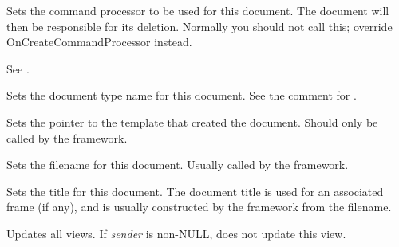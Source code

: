 Sets the command processor to be used for this document. The document will then be responsible
for its deletion. Normally you should not call this; override OnCreateCommandProcessor
instead.

See .



Sets the document type name for this document. See the comment for .



Sets the pointer to the template that created the document. Should only be called by the
framework.



Sets the filename for this document. Usually called by the framework.



Sets the title for this document. The document title is used for an associated
frame (if any), and is usually constructed by the framework from
the filename.

\label{wxdocumentupdateallviews}


Updates all views. If {\it sender} is non-NULL, does not update this view.


